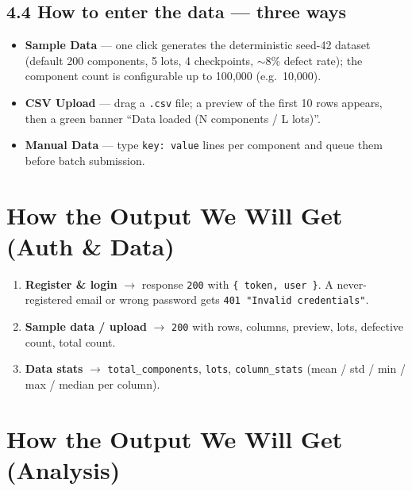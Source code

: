 \documentclass[11pt,a4paper]{article}
\newcommand{\code}[1]{\texttt{\small #1}}
\newcommand{\keys}[1]{\textbf{\sffamily#1}}
\newcommand{\answerbox}[2]{\par\vspace{0.8em}\noindent
  \begin{tcolorbox}[colback=isroblue!6,colframe=isroblue,
    title={\sffamily\bfseries\color{white}#1},arc=2pt,boxrule=1.2pt]
    #2
  \end{tcolorbox}\par\vspace{0.4em}}
\begin{document}
\subsection*{4.4 How to enter the data --- three ways}
\begin{itemize}[leftmargin=1.5em]
  \item \keys{Sample Data} --- one click generates the deterministic seed-42 dataset (default 200
        components, 5 lots, 4 checkpoints, $\sim$8\% defect rate); the component count is
        configurable up to 100{,}000 (e.g.\ 10{,}000).
  \item \keys{CSV Upload} --- drag a \code{.csv} file; a preview of the first 10 rows appears, then
        a green banner ``Data loaded (N components / L lots)''.
  \item \keys{Manual Data} --- type \code{key: value} lines per component and queue them before
        batch submission.
\end{itemize}

\section{How the Output We Will Get (Auth \& Data)}

\answerbox{Step-by-step outputs after upload}{
  \begin{enumerate}[leftmargin=1.6em]
    \item \textbf{Register \& login} $\rightarrow$ response \code{200} with \code{\{ token, user \}}.
          A never-registered email or wrong password gets \code{401 {\tt "Invalid credentials"}}.
    \item \textbf{Sample data / upload} $\rightarrow$ \code{200} with rows, columns, preview,
          lots, defective count, total count.
    \item \textbf{Data stats} $\rightarrow$ \code{total\_components}, \code{lots},
          \code{column\_stats} (mean / std / min / max / median per column).
  \end{enumerate}
}

\section{How the Output We Will Get (Analysis)}
\end{document}
